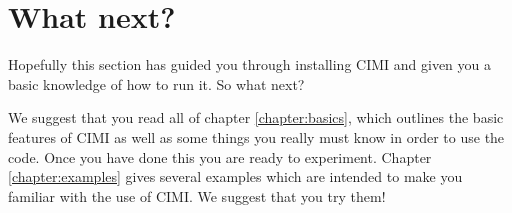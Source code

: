 \section{What next?}

Hopefully this section has guided you through installing CIMI and
given you a basic knowledge of how to run it.  So what next?

We suggest that you read all of chapter \ref{chapter:basics}, which
outlines the basic features of CIMI as well as some things you
really must know in order to use the code.  Once you have done this you
are ready to experiment.  Chapter \ref{chapter:examples} gives several 
examples which are intended to make you familiar with the use of CIMI.  We suggest that you try them!

%
